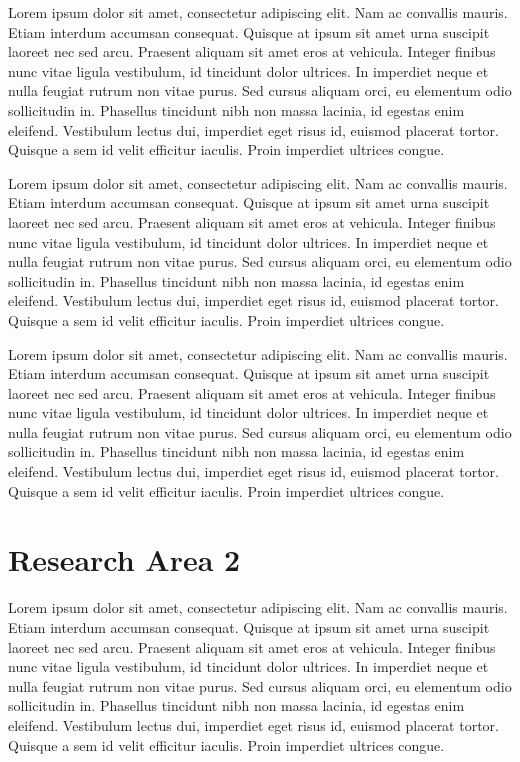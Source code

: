 \documentclass[oneside]{memoir}
\begin{document}
Lorem ipsum dolor sit amet, consectetur adipiscing elit. Nam ac convallis mauris. Etiam interdum accumsan consequat. Quisque at ipsum sit amet urna suscipit laoreet nec sed arcu. Praesent aliquam sit amet eros at vehicula. Integer finibus nunc vitae ligula vestibulum, id tincidunt dolor ultrices. In imperdiet neque et nulla feugiat rutrum non vitae purus. Sed cursus aliquam orci, eu elementum odio sollicitudin in. Phasellus tincidunt nibh non massa lacinia, id egestas enim eleifend. Vestibulum lectus dui, imperdiet eget risus id, euismod placerat tortor. Quisque a sem id velit efficitur iaculis. Proin imperdiet ultrices congue.

Lorem ipsum dolor sit amet, consectetur adipiscing elit. Nam ac convallis mauris. Etiam interdum accumsan consequat. Quisque at ipsum sit amet urna suscipit laoreet nec sed arcu. Praesent aliquam sit amet eros at vehicula. Integer finibus nunc vitae ligula vestibulum, id tincidunt dolor ultrices. In imperdiet neque et nulla feugiat rutrum non vitae purus. Sed cursus aliquam orci, eu elementum odio sollicitudin in. Phasellus tincidunt nibh non massa lacinia, id egestas enim eleifend. Vestibulum lectus dui, imperdiet eget risus id, euismod placerat tortor. Quisque a sem id velit efficitur iaculis. Proin imperdiet ultrices congue.

Lorem ipsum dolor sit amet, consectetur adipiscing elit. Nam ac convallis mauris. Etiam interdum accumsan consequat. Quisque at ipsum sit amet urna suscipit laoreet nec sed arcu. Praesent aliquam sit amet eros at vehicula. Integer finibus nunc vitae ligula vestibulum, id tincidunt dolor ultrices. In imperdiet neque et nulla feugiat rutrum non vitae purus. Sed cursus aliquam orci, eu elementum odio sollicitudin in. Phasellus tincidunt nibh non massa lacinia, id egestas enim eleifend. Vestibulum lectus dui, imperdiet eget risus id, euismod placerat tortor. Quisque a sem id velit efficitur iaculis. Proin imperdiet ultrices congue.

%
%

\chapter{Research Area 2}
\label{ch:realtime}

Lorem ipsum dolor sit amet, consectetur adipiscing elit. Nam ac convallis mauris. Etiam interdum accumsan consequat. Quisque at ipsum sit amet urna suscipit laoreet nec sed arcu. Praesent aliquam sit amet eros at vehicula. Integer finibus nunc vitae ligula vestibulum, id tincidunt dolor ultrices. In imperdiet neque et nulla feugiat rutrum non vitae purus. Sed cursus aliquam orci, eu elementum odio sollicitudin in. Phasellus tincidunt nibh non massa lacinia, id egestas enim eleifend. Vestibulum lectus dui, imperdiet eget risus id, euismod placerat tortor. Quisque a sem id velit efficitur iaculis. Proin imperdiet ultrices congue.
\end{document}
